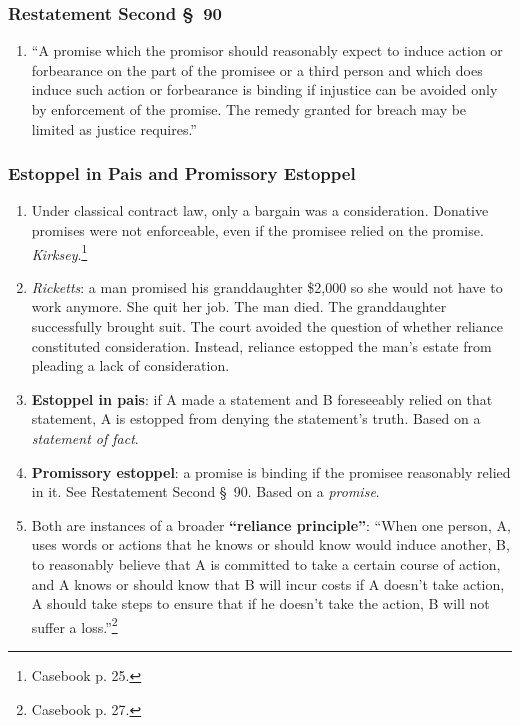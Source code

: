 \subsubsection{Restatement Second \S\ 90}

\begin{enumerate}
    \item ``A promise which the promisor should reasonably expect to induce 
    action or forbearance on the part of the promisee or a third person and 
    which does induce such action or forbearance is binding if injustice can 
    be avoided only by enforcement of the promise. The remedy granted for 
    breach may be limited as justice requires.''
\end{enumerate}

\subsubsection{Estoppel in Pais and Promissory Estoppel}

\begin{enumerate}
    \item Under classical contract law, only a bargain was a consideration. 
    Donative promises were not enforceable, even if the promisee relied on the 
    promise. \emph{Kirksey}.\footnote{Casebook p. 25.}
    \item \emph{Ricketts}: a man promised his granddaughter \$2,000 so she 
    would not have to work anymore. She quit her job. The man died. The 
    granddaughter successfully brought suit. The court avoided the question of 
    whether reliance constituted consideration. Instead, reliance estopped the 
    man's estate from pleading a lack of consideration.
    \item \textbf{Estoppel in pais}: if A made a statement and B foreseeably 
    relied on that statement, A is estopped from denying the statement's 
    truth. Based on a \emph{statement of fact}.
    \item \textbf{Promissory estoppel}: a promise is binding if the promisee 
    reasonably relied in it. See Restatement Second \S\ 90. Based on a 
    \emph{promise}.
    \item Both are instances of a broader \textbf{``reliance principle''}: 
    ``When one person, A, uses words or actions that he knows or should know 
    would induce another, B, to reasonably believe that A is committed to take 
    a certain course of action, and A knows or should know that B will incur 
    costs if A doesn't take action, A should take steps to ensure that if he 
    doesn't take the action, B will not suffer a loss.''\footnote{Casebook p. 
    27.}
\end{enumerate}

